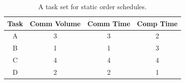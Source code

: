 \documentclass[sigconf]{acmart}
\begin{document}
	\begin{table}[htb]
		\begin{center}
			
			\begin{tabular}{|c|c|c|c|}
				\hline
				Task & Comm Volume & Comm Time & Comp Time\\ \hline 
				A & 3 & 3 &  2\\ \hline
				B & 1 & 1 & 3\\ \hline
				C & 4 & 4 & 4\\ \hline
				D & 2 & 2 & 1\\ \hline
			\end{tabular}
			\caption{\label{tab:staticOrderExample} A task set for static order schedules.}
		\end{center}
	\end{table}
	
\end{document}
